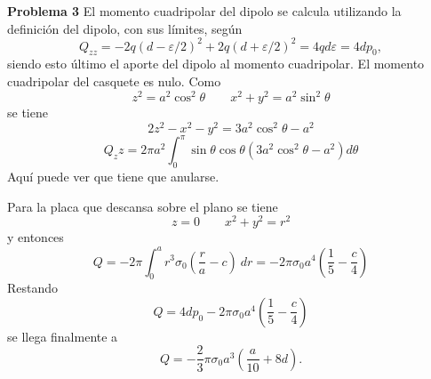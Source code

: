 \documentclass[10pt,oneside]{CBFT_book}
\begin{document}
\begin{ejemplo}{\bf Problema 3}
El momento cuadripolar del dipolo se calcula utilizando la definición del dipolo, con sus límites,
según
\[
	Q_{zz} = - 2 q (d - \varepsilon/2 )^2 + 2 q (d + \varepsilon/2 )^2 = 4 q d \varepsilon = 4 d p_0,
\]
siendo esto último el aporte del dipolo al momento cuadripolar.
El momento cuadripolar del casquete es nulo. Como
\[
	z^2 = a^2 \cos^2\theta \qquad x^2 + y^2 = a^2 \sin^2\theta
\]
se tiene
\[
	2z^2 - x^2 -y^2 = 3 a^2 \cos^2\theta -a^2
\]
\[
	Q_zz = 2 \pi a^2 \int_0^\pi \sin\theta \cos\theta ( 3 a^2 \cos^2 \theta - a^2 ) d\theta
\]
Aquí puede ver que tiene que anularse.

Para la placa que descansa sobre el plano se tiene
\[
	z = 0 \qquad x^2 + y^2 = r^2
\]
y entonces
\[
	Q = -2\pi \int_0^a r^3 \sigma_0 \left( \frac{r}{a} - c \right) \: dr =
	- 2 \pi \sigma_0 a^4 \left( \frac{1}{5} - \frac{c}{4} \right)
\]
Restando
\[
	Q = 4 dp_0 - 2 \pi \sigma_0 a^4 \left( \frac{1}{5} - \frac{c}{4} \right) 
\]
se llega finalmente a
\[
	Q = - \frac{2}{3} \pi \sigma_0 a^3 \left( \frac{a}{10} + 8 d \right).
\]
 
\end{ejemplo}
\end{document}
